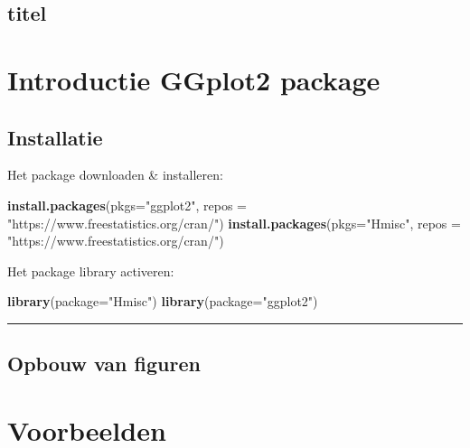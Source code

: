 \documentclass[]{article}
\newenvironment{Shaded}{\begin{snugshade}}{\end{snugshade}}
\newcommand{\KeywordTok}[1]{\textcolor[rgb]{0.13,0.29,0.53}{\textbf{{#1}}}}
\newcommand{\DataTypeTok}[1]{\textcolor[rgb]{0.13,0.29,0.53}{{#1}}}
\newcommand{\StringTok}[1]{\textcolor[rgb]{0.31,0.60,0.02}{{#1}}}
\newcommand{\NormalTok}[1]{{#1}}
\begin{document}
\subsection{titel}\label{titel}

\section{Introductie GGplot2 package}\label{introductie-ggplot2-package}

\subsection{Installatie}\label{installatie}

Het package downloaden \& installeren:

\begin{Shaded}
\begin{Highlighting}[]
\KeywordTok{install.packages}\NormalTok{(}\DataTypeTok{pkgs=}\StringTok{"ggplot2"}\NormalTok{, }\DataTypeTok{repos =} \StringTok{"https://www.freestatistics.org/cran/"}\NormalTok{)}
\KeywordTok{install.packages}\NormalTok{(}\DataTypeTok{pkgs=}\StringTok{"Hmisc"}\NormalTok{,   }\DataTypeTok{repos =} \StringTok{"https://www.freestatistics.org/cran/"}\NormalTok{)}
\end{Highlighting}
\end{Shaded}

Het package library activeren:

\begin{Shaded}
\begin{Highlighting}[]
\KeywordTok{library}\NormalTok{(}\DataTypeTok{package=}\StringTok{"Hmisc"}\NormalTok{)}
\KeywordTok{library}\NormalTok{(}\DataTypeTok{package=}\StringTok{"ggplot2"}\NormalTok{)}
\end{Highlighting}
\end{Shaded}

\begin{center}\rule{0.5\linewidth}{\linethickness}\end{center}

\newpage

\subsection{Opbouw van figuren}\label{opbouw-van-figuren}

\section{Voorbeelden}\label{voorbeelden}
\end{document}

